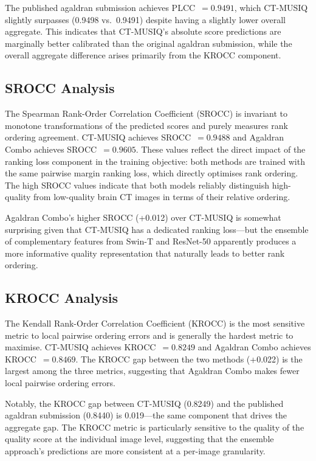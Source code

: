 The published agaldran submission achieves PLCC~$= 0.9491$, which CT-MUSIQ slightly
surpasses (0.9498 vs.\ 0.9491) despite having a slightly lower overall aggregate. This
indicates that CT-MUSIQ's absolute score predictions are marginally better calibrated
than the original agaldran submission, while the overall aggregate difference arises
primarily from the KROCC component.

\subsection{SROCC Analysis}

The Spearman Rank-Order Correlation Coefficient (SROCC) is invariant to monotone
transformations of the predicted scores and purely measures rank ordering agreement.
CT-MUSIQ achieves SROCC~$= 0.9488$ and Agaldran Combo achieves SROCC~$= 0.9605$.
These values reflect the direct impact of the ranking loss component in the training
objective: both methods are trained with the same pairwise margin ranking loss, which
directly optimises rank ordering. The high SROCC values indicate that both models
reliably distinguish high-quality from low-quality brain CT images in terms of their
relative ordering.

Agaldran Combo's higher SROCC (+0.012) over CT-MUSIQ is somewhat surprising given that
CT-MUSIQ has a dedicated ranking loss---but the ensemble of complementary features
from Swin-T and ResNet-50 apparently produces a more informative quality representation
that naturally leads to better rank ordering.

\subsection{KROCC Analysis}

The Kendall Rank-Order Correlation Coefficient (KROCC) is the most sensitive metric to
local pairwise ordering errors and is generally the hardest metric to maximise. CT-MUSIQ
achieves KROCC~$= 0.8249$ and Agaldran Combo achieves KROCC~$= 0.8469$. The KROCC
gap between the two methods (+0.022) is the largest among the three metrics, suggesting
that Agaldran Combo makes fewer local pairwise ordering errors.

Notably, the KROCC gap between CT-MUSIQ (0.8249) and the published agaldran submission
(0.8440) is 0.019---the same component that drives the aggregate gap. The KROCC metric
is particularly sensitive to the quality of the quality score at the individual image
level, suggesting that the ensemble approach's predictions are more consistent at a
per-image granularity.


